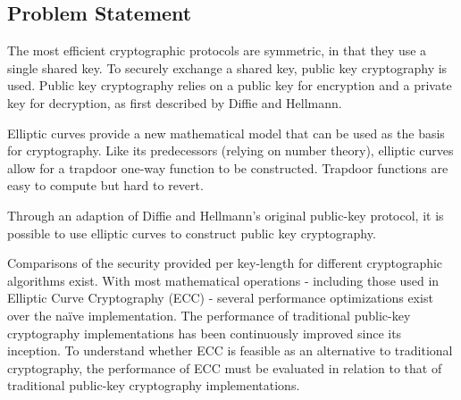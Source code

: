 \subsection{Problem Statement}

The most efficient cryptographic protocols are symmetric, in that they use a single shared key. To securely exchange a shared key, public key cryptography is used. Public key cryptography relies on a public key for encryption and a private key for decryption, as first described by Diffie and Hellmann.

Elliptic curves provide a new mathematical model that can be used as the basis for cryptography. Like its predecessors (relying on number theory), elliptic curves allow for a trapdoor one-way function to be constructed. Trapdoor functions are easy to compute but hard to revert.

Through an adaption of Diffie and Hellmann’s original public-key protocol, it is possible to use elliptic curves to construct public key cryptography.

Comparisons of the security provided per key-length for different cryptographic algorithms exist. With most mathematical operations - including those used in Elliptic Curve Cryptography (ECC) - several performance optimizations exist over the naïve implementation. The performance of traditional public-key cryptography implementations has been continuously improved since its inception. To understand whether ECC is feasible as an alternative to traditional cryptography, the performance of ECC must be evaluated in relation to that of traditional public-key cryptography implementations.